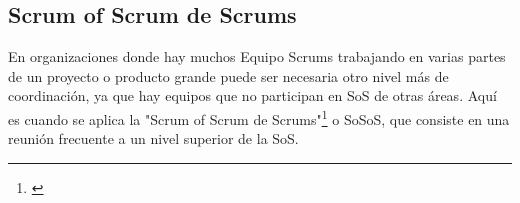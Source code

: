 \subsection{Scrum of Scrum de Scrums}

En organizaciones donde hay muchos Equipo Scrums trabajando en varias partes de un proyecto o producto grande puede ser necesaria otro nivel más de coordinación, ya que hay equipos que no participan en SoS de otras áreas. Aquí es cuando se aplica la "Scrum of Scrum de Scrums"\footnote{\cite{SBOK-2013}} o SoSoS, que consiste en una reunión frecuente a un nivel superior de la SoS.
